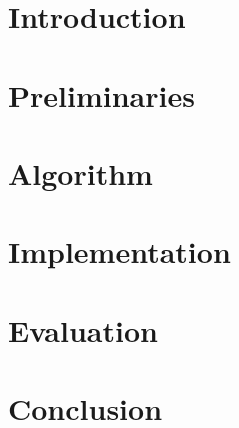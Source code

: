 






\chapter{Introduction}
\label{chap:intro}


\chapter{Preliminaries}
\label{chap:preliminaries}


\chapter{Algorithm}
\label{chap:algorithm}


\chapter{Implementation}
\label{chap:implementation}


\chapter{Evaluation}
\label{chap:evaluation}


\chapter{Conclusion}
\label{chap:conclusions}


\printbibliography[heading=bibintoc] %



